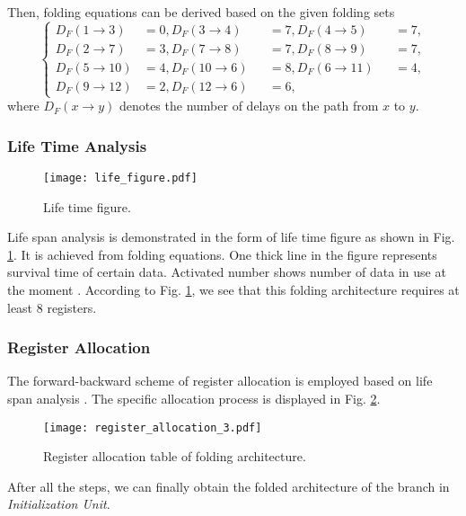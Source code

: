 \documentclass[journal,twoside]{IEEEtran}
\begin{document}
Then, folding equations can be derived based on the given folding sets
{\small
\begin{equation}\label{eq:d}
\left\{
\begin{alignedat}{3}
D_{F}(1\rightarrow3)&= 0,D_{F}(3\rightarrow4)&&= 7,D_{F}(4\rightarrow5) &&= 7,\\
D_{F}(2\rightarrow7)&= 3,D_{F}(7\rightarrow8)&&= 7,D_{F}(8\rightarrow9) &&= 7,\\
D_{F}(5\rightarrow10)&= 4,D_{F}(10\rightarrow6)&&= 8,D_{F}(6\rightarrow11) &&= 4,\\
D_{F}(9\rightarrow12)&= 2,D_{F}(12\rightarrow6)&&= 6,
\end{alignedat}
\right.
\end{equation}}
where $D_{F}(x\rightarrow y)$ denotes the number of delays on the path from $x$ to $y$.

\subsubsection{Life Time Analysis}
\begin{figure}[htbp]
\centering
\texttt{[image: life\_figure.pdf]}
\caption{Life time figure.}
\label{fig:Life time figure}
\end{figure}

Life span analysis is demonstrated in the form of life time figure as shown in Fig. \ref{fig:Life time figure}. It is achieved from folding equations. One thick line in the figure represents survival time of certain data. Activated number shows number of data in use at the moment \cite{parhi1994calculation}. According to Fig. \ref{fig:Life time figure}, we see that this folding architecture requires at least $8$ registers.

\subsubsection{Register Allocation}
The forward-backward scheme of register allocation is employed based on life span analysis \cite{parhi1992systematic}. The specific allocation process is displayed in Fig. \ref{fig:Register allocation table of folding architecture}.
\begin{figure}[htbp]
\centering
\texttt{[image: register\_allocation\_3.pdf]}
\caption{Register allocation table of folding architecture.}
\label{fig:Register allocation table of folding architecture}
\end{figure}

After all the steps, we can finally obtain the folded architecture of the branch in \emph{Initialization Unit}.
\end{document}
